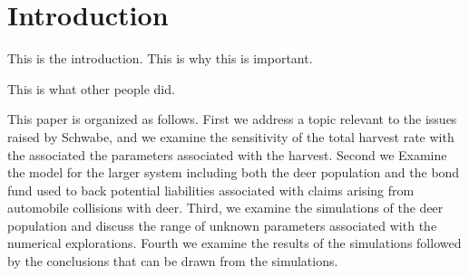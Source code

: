 

\section{Introduction}

This is the introduction. This is why this is important.

This is what other people did.

This paper is organized as follows. First we address a topic relevant
to the issues raised by Schwabe, and we examine the sensitivity of the
total harvest rate with the associated the parameters associated with
the harvest. Second we Examine the model for the larger system
including both the deer population and the bond fund used to back
potential liabilities associated with claims arising from automobile
collisions with deer. Third, we examine the simulations of the deer
population and discuss the range of unknown parameters associated with
the numerical explorations. Fourth we examine the results of the
simulations followed by the conclusions that can be drawn from the
simulations.

